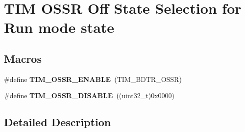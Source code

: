 \hypertarget{group___t_i_m___o_s_s_r___off___state___selection__for___run__mode__state}{\section{T\-I\-M O\-S\-S\-R Off State Selection for Run mode state}
\label{group___t_i_m___o_s_s_r___off___state___selection__for___run__mode__state}
}
\subsection*{Macros}
\begin{DoxyCompactItemize}
\item 
\hypertarget{group___t_i_m___o_s_s_r___off___state___selection__for___run__mode__state_ga5d21918f173eca946748a1fbc177daa5}{\#define {\bfseries T\-I\-M\-\_\-\-O\-S\-S\-R\-\_\-\-E\-N\-A\-B\-L\-E}~(T\-I\-M\-\_\-\-B\-D\-T\-R\-\_\-\-O\-S\-S\-R)}\label{group___t_i_m___o_s_s_r___off___state___selection__for___run__mode__state_ga5d21918f173eca946748a1fbc177daa5}

\item 
\hypertarget{group___t_i_m___o_s_s_r___off___state___selection__for___run__mode__state_gae11820b467ef6d74c90190c8cfce5e73}{\#define {\bfseries T\-I\-M\-\_\-\-O\-S\-S\-R\-\_\-\-D\-I\-S\-A\-B\-L\-E}~((uint32\-\_\-t)0x0000)}\label{group___t_i_m___o_s_s_r___off___state___selection__for___run__mode__state_gae11820b467ef6d74c90190c8cfce5e73}

\end{DoxyCompactItemize}


\subsection{Detailed Description}
